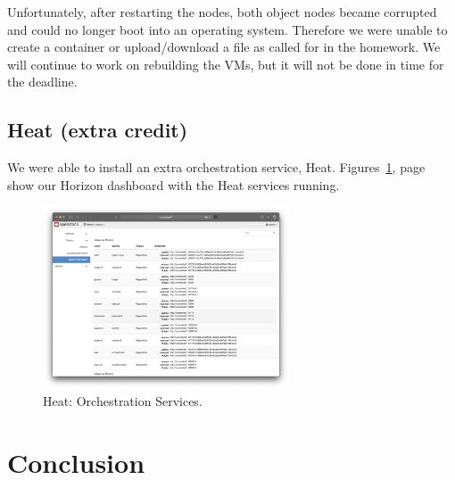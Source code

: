 \documentclass{article}
\begin{document}
Unfortunately, after restarting the nodes, both object nodes became corrupted and could no longer boot into an operating system. Therefore we were unable to create a container or upload/download a file as called for in the homework. We will continue to work on rebuilding the VMs, but it will not be done in time for the deadline.








\subsection{Heat (extra credit)}

We were able to install an extra orchestration service, Heat. Figures~\ref{fig:Heat}, page~\pageref{fig:Heat} show our Horizon dashboard with the Heat services running.
\begin{figure}[ht]
    \centering
    \includegraphics[width=0.65\textwidth]{Heat.png}
    \caption{Heat: Orchestration Services.}
    \label{fig:Heat}
\end{figure}




\newpage

\section{Conclusion}
\end{document}
